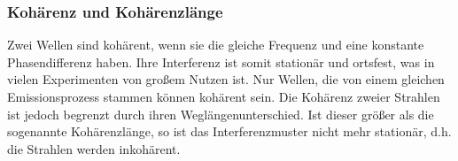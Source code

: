\subsubsection{Kohärenz und Kohärenzlänge}

Zwei Wellen sind kohärent, wenn sie die gleiche Frequenz und eine konstante Phasendifferenz haben. Ihre Interferenz ist somit stationär und ortsfest, was in vielen Experimenten von großem Nutzen ist. Nur Wellen, die von einem gleichen Emissionsprozess stammen können kohärent sein. Die Kohärenz zweier Strahlen ist jedoch begrenzt durch ihren Weglängenunterschied. Ist dieser größer als die sogenannte Kohärenzlänge, so ist das Interferenzmuster nicht mehr stationär, d.h. die Strahlen werden inkohärent. 






















